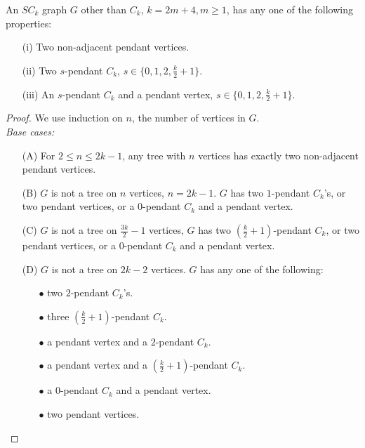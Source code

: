 \documentclass[runningheads]{llncs}
\begin{document}
\begin{lemma}
\label{specialvertex2k}
An $SC_k$ graph $G$ other than $C_k$, $k = 2m+4, m \geq 1$, has any one of the following properties:
\begin{itemize}
\item[(i)] Two non-adjacent pendant vertices.
\item[(ii)] Two $s$-pendant $C_k$, $s \in \{0,1,2,\frac{k}{2}+1\}$.
\item[(iii)] An $s$-pendant $C_k$ and a pendant vertex, $s \in \{0,1,2,\frac{k}{2}+1\}$.
\end{itemize}
\end{lemma}
\begin{proof}
We use induction on $n$, the number of vertices in $G$.\\
\noindent \emph{Base cases:} \vspace{-0.16cm}
\begin{itemize}
\item[(A)] For $2 \leq n \leq 2k-1$, any tree with $n$ vertices has exactly two non-adjacent pendant vertices.
\item[(B)] $G$ is not a tree on $n$ vertices, $n=2k-1$. $G$ has two $1$-pendant $C_k$'s, or two pendant vertices, or a $0$-pendant $C_k$ and a pendant vertex.
\item[(C)] $G$ is not a tree on $\frac{3k}{2}-1$ vertices, $G$ has two $(\frac{k}{2}+1)$-pendant $C_k$, or two pendant vertices, or a $0$-pendant $C_k$ and a pendant vertex.
\item[(D)] $G$ is not a tree on $2k-2$ vertices. $G$ has any one of the following:
\begin{itemize}
\item[$\bullet$] two $2$-pendant $C_k$'s.
\item[$\bullet$] three $(\frac{k}{2}+1)$-pendant $C_k$.
\item[$\bullet$] a pendant vertex and a $2$-pendant $C_k$.
\item[$\bullet$] a pendant vertex and a $(\frac{k}{2}+1)$-pendant $C_k$.
\item[$\bullet$] a $0$-pendant $C_k$ and a pendant vertex.
\item[$\bullet$] two pendant vertices.
\end{itemize}
 

\end{itemize}
\end{proof}
\end{document}
